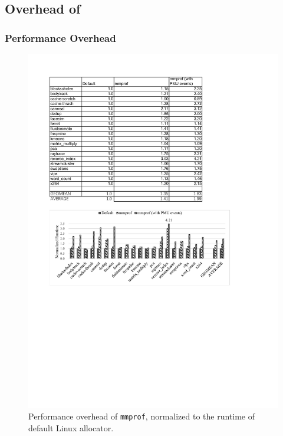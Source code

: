 \subsection{Overhead of \MP{}}

\subsubsection{Performance Overhead}
\label{sec:perf}

\begin{figure}[htbp]
\centering
\includegraphics[width=\columnwidth]{figures/mmprofPerformance}
\caption{Performance overhead of \texttt{mmprof}, normalized to the runtime of default Linux allocator.\label{fig:overhead}}
\end{figure}

